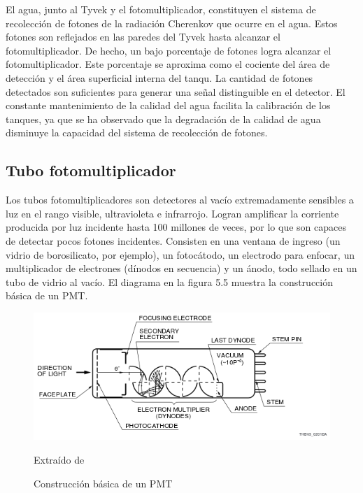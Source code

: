 \documentclass{book}
\begin{document}
El agua, junto al Tyvek y el fotomultiplicador, constituyen el sistema de recolecci\'on de fotones de la radiaci\'on Cherenkov que ocurre en el agua. Estos fotones son reflejados en las paredes del Tyvek hasta alcanzar el fotomultiplicador. De hecho, un bajo porcentaje de fotones logra alcanzar el fotomultiplicador. Este porcentaje se aproxima como el cociente del \'area de detecci\'on y el \'area superficial interna del tanqu. La cantidad de fotones detectados son suficientes para generar una se\~nal distinguible en el detector. El constante mantenimiento de la calidad del agua facilita la calibraci\'on de los tanques, ya que se ha observado que la degradaci\'on de la calidad de agua disminuye la capacidad del sistema de recolecci\'on de fotones. \citep{PEREZ}

\subsection{Tubo fotomultiplicador}

Los tubos fotomultiplicadores son detectores al vac\'io extremadamente sensibles a luz en el rango visible, ultravioleta e infrarrojo. Logran amplificar la corriente producida por luz incidente hasta 100 millones de veces, por lo que son capaces de detectar pocos fotones incidentes. Consisten en una ventana de ingreso (un vidrio de borosilicato, por ejemplo), un fotoc\'atodo, un electrodo para enfocar, un multiplicador de electrones (d\'inodos en secuencia) y un \'anodo, todo sellado en un tubo de vidrio al vac\'io. El diagrama en la figura 5.5 muestra la construcci\'on b\'asica de un PMT. \citep{Hamamatsu}

\begin{figure}[ht] %
\begin{center}
 \includegraphics[width =0.8\linewidth]{Hamamatsu.png}
 
 Extra\'ido de \citep{Hamamatsu}
\caption{Construcci\'on b\'asica de un PMT}
\end{center}
\end{figure}
\end{document}
